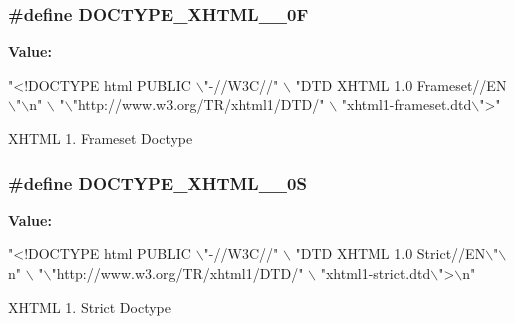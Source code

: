 \subsubsection[{\texorpdfstring{D\+O\+C\+T\+Y\+P\+E\+\_\+\+X\+H\+T\+M\+L\+\_\+1\+\_\+0F}{DOCTYPE_XHTML_1_0F}}]{\setlength{\rightskip}{0pt plus 5cm}\#define D\+O\+C\+T\+Y\+P\+E\+\_\+\+X\+H\+T\+M\+L\+\_\+\_\+0F}\hypertarget{group__APACHE__CORE__DAEMON_ga989caf00bd323a633f5da00ea176c6c5}{}\label{group__APACHE__CORE__DAEMON_ga989caf00bd323a633f5da00ea176c6c5}
{\bfseries Value\+:}
\begin{DoxyCode}
\textcolor{stringliteral}{"<!DOCTYPE html PUBLIC \(\backslash\)"-//W3C//"} \(\backslash\)
                           \textcolor{stringliteral}{"DTD XHTML 1.0 Frameset//EN\(\backslash\)"\(\backslash\)n"} \(\backslash\)
                           \textcolor{stringliteral}{"\(\backslash\)"http://www.w3.org/TR/xhtml1/DTD/"} \(\backslash\)
                           \textcolor{stringliteral}{"xhtml1-frameset.dtd\(\backslash\)">"}
\end{DoxyCode}
X\+H\+T\+ML 1. Frameset Doctype 
\subsubsection[{\texorpdfstring{D\+O\+C\+T\+Y\+P\+E\+\_\+\+X\+H\+T\+M\+L\+\_\+1\+\_\+0S}{DOCTYPE_XHTML_1_0S}}]{\setlength{\rightskip}{0pt plus 5cm}\#define D\+O\+C\+T\+Y\+P\+E\+\_\+\+X\+H\+T\+M\+L\+\_\+\_\+0S}\hypertarget{group__APACHE__CORE__DAEMON_ga1b747d3a2021b33a60218641dc85a9a3}{}\label{group__APACHE__CORE__DAEMON_ga1b747d3a2021b33a60218641dc85a9a3}
{\bfseries Value\+:}
\begin{DoxyCode}
\textcolor{stringliteral}{"<!DOCTYPE html PUBLIC \(\backslash\)"-//W3C//"} \(\backslash\)
                           \textcolor{stringliteral}{"DTD XHTML 1.0 Strict//EN\(\backslash\)"\(\backslash\)n"} \(\backslash\)
                           \textcolor{stringliteral}{"\(\backslash\)"http://www.w3.org/TR/xhtml1/DTD/"} \(\backslash\)
                           \textcolor{stringliteral}{"xhtml1-strict.dtd\(\backslash\)">\(\backslash\)n"}
\end{DoxyCode}
X\+H\+T\+ML 1. Strict Doctype 
